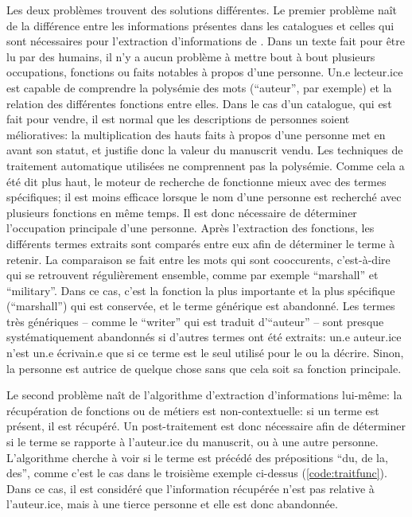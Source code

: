 Les deux problèmes trouvent des solutions différentes. Le premier problème naît de la différence entre les informations présentes dans les catalogues et celles qui sont nécessaires pour l'extraction d'informations de \wkd{}. Dans un texte fait pour être lu par des humains, il n'y a aucun problème à mettre bout à bout plusieurs occupations, fonctions ou faits notables à propos d'une personne. Un.e lecteur.ice est capable de comprendre la polysémie des mots (\enquote{auteur}, par exemple) et la relation des différentes fonctions entre elles. Dans le cas d'un catalogue, qui est fait pour vendre, il est normal que les descriptions de personnes soient mélioratives: la multiplication des hauts faits à propos d'une personne met en avant son statut, et justifie donc la valeur du manuscrit vendu. Les techniques de traitement automatique utilisées ne comprennent pas la polysémie. Comme cela a été dit plus haut, le moteur de recherche de \wkd{} fonctionne mieux avec des termes spécifiques; il est moins efficace lorsque le nom d'une personne est recherché avec plusieurs fonctions en même temps. Il est donc nécessaire de déterminer l'occupation principale d'une personne. Après l'extraction des fonctions, les différents termes extraits sont comparés entre eux afin de déterminer le terme à retenir. La comparaison se fait entre les mots qui sont cooccurents, c'est-à-dire qui se retrouvent régulièrement ensemble, comme par exemple \enquote{marshall} et \enquote{military}. Dans ce cas, c'est la fonction la plus importante et la plus spécifique (\enquote{marshall}) qui est conservée, et le terme générique est abandonné. Les termes très génériques -- comme le \enquote{writer} qui est traduit d'\enquote{auteur} -- sont presque systématiquement abandonnés si d'autres termes ont été extraits: un.e auteur.ice n'est un.e écrivain.e que si ce terme est le seul utilisé pour le ou la décrire. Sinon, la personne est autrice de quelque chose sans que cela soit sa fonction principale.

Le second problème naît de l'algorithme d'extraction d'informations lui-même: la récupération de fonctions ou de métiers est non-contextuelle: si un terme est présent, il est récupéré. Un post-traitement est donc nécessaire afin de déterminer si le terme se rapporte à l'auteur.ice du manuscrit, ou à une autre personne. L'algorithme cherche à voir si le terme est précédé des prépositions \enquote{du, de la, des}, comme c'est le cas dans le troisième exemple ci-dessus (\ref{code:traitfunc}). Dans ce cas, il est considéré que l'information récupérée n'est pas relative à l'auteur.ice, mais à une tierce personne et elle est donc abandonnée.

